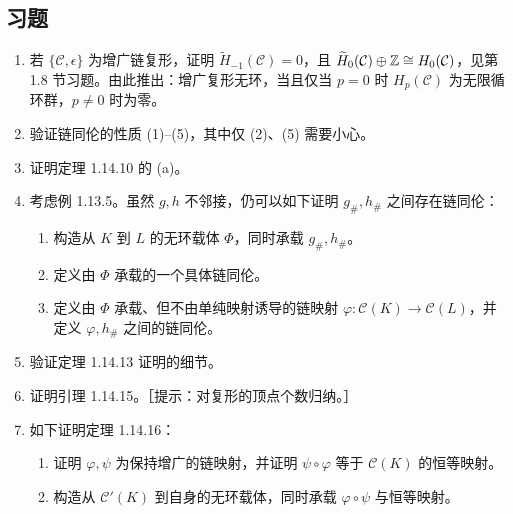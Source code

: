 \subsection*{习题}
\begin{enumerate}
\item 若 $\{\mathcal C,\epsilon\}$ 为增广链复形，证明 $\widetilde H_{-1}(\mathcal C)=0$，且 $\widetilde H_0(\mathcal C)\oplus\mathbb{Z}\cong H_0(\mathcal C)$，见第 1.8 节习题。由此推出：增广复形无环，当且仅当 $p=0$ 时 $H_p(\mathcal C)$ 为无限循环群，$p\ne0$ 时为零。
\item 验证链同伦的性质 (1)--(5)，其中仅 (2)、(5) 需要小心。
\item 证明定理 1.14.10 的 (a)。
\item 考虑例 1.13.5。虽然 $g,h$ 不邻接，仍可以如下证明 $g_\#,h_\#$ 之间存在链同伦：
\begin{enumerate}[label=(\alph*)]
\item 构造从 $K$ 到 $L$ 的无环载体 $\Phi$，同时承载 $g_\#,h_\#$。
\item 定义由 $\Phi$ 承载的一个具体链同伦。
\item 定义由 $\Phi$ 承载、但不由单纯映射诱导的链映射 $\varphi:\mathcal C(K)\to\mathcal C(L)$，并定义 $\varphi,h_\#$ 之间的链同伦。
\end{enumerate}
\item 验证定理 1.14.13 证明的细节。
\item 证明引理 1.14.15。［提示：对复形的顶点个数归纳。］
\item 如下证明定理 1.14.16：
\begin{enumerate}[label=(\alph*)]
\item 证明 $\varphi,\psi$ 为保持增广的链映射，并证明 $\psi\circ\varphi$ 等于 $\mathcal C(K)$ 的恒等映射。
\item 构造从 $\mathcal C'(K)$ 到自身的无环载体，同时承载 $\varphi\circ\psi$ 与恒等映射。
\end{enumerate}
\end{enumerate}
